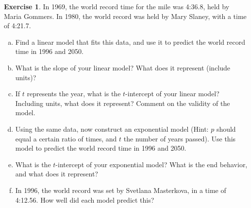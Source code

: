 \documentclass[11pt,reqno,final]{amsart}
\numberwithin{equation}{section}
\numberwithin{figure}{section}
\theoremstyle{definition} %
\newtheorem{exercise}{Exercise}
\begin{document}
\begin{exercise}
        In 1969, the world record time for the mile was 4:36.8, held by Maria Gommers.
        In 1980, the world record was held by Mary Slaney, with a time of 4:21.7.
        \begin{enumerate}[(a)]
        \item Find a linear model that fits this data, and use it to predict the world record time in 1996 and 2050.
                \vfill
                \vfill
        \item What is the slope of your linear model? What does it represent (include units)?
                \vfill
        \item If $t$ represents the year, what is the $t$-intercept of your linear model?
                Including units, what does it represent?
                Comment on the validity of the model.
                \vfill
        \item Using the same data, now construct an exponential model
                (Hint: $p$ should equal a certain ratio of times, and $t$ the number of years passed).
                Use this model to predict the world record time in 1996 and 2050.
                \vfill
                \vfill
        \item What is the $t$-intercept of your exponential model? What is the end behavior, and what does it represent?
                \vfill
        \item In 1996, the world record was set by Svetlana Masterkova, in a time of 4:12.56.
                How well did each model predict this?
                \vfill
        \end{enumerate}
\end{exercise}
\end{document}
